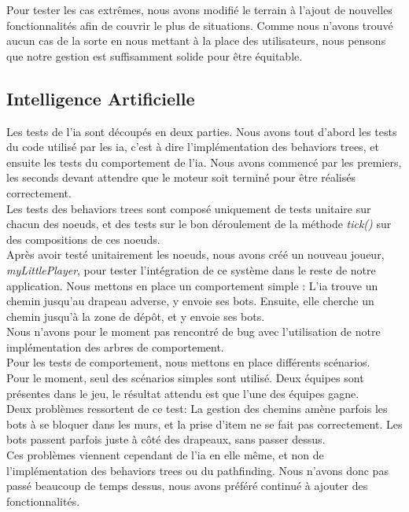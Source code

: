 Pour tester les cas extrêmes, nous avons modifié le terrain à l'ajout de nouvelles fonctionnalités afin de couvrir le plus de situations. Comme nous n'avons trouvé aucun cas de la sorte en nous mettant à la place des utilisateurs, nous pensons que notre gestion est suffisamment solide pour être équitable.

\newpage
\subsection{Intelligence Artificielle}
Les tests de l'ia sont découpés en deux parties. Nous avons tout d'abord les tests du code utilisé par les ia, c'est à dire l'implémentation des behaviors trees, et ensuite les tests du comportement de l'ia. Nous avons commencé par les premiers, les seconds devant attendre que le moteur soit terminé pour être réalisés correctement. \\

Les tests des behaviors trees sont composé uniquement de tests unitaire sur chacun des noeuds, et des tests sur le bon déroulement de la méthode \textit{tick()} sur des compositions de ces noeuds.\\
Après avoir testé unitairement les noeuds, nous avons créé un nouveau joueur, \textit{myLittlePlayer}, pour tester l'intégration de ce système dans le reste de notre application. Nous mettons en place un comportement simple : L'ia trouve un chemin jusqu'au drapeau adverse, y envoie ses bots. Ensuite, elle cherche un chemin jusqu'à la zone de dépôt, et y envoie ses bots.\\
Nous n'avons pour le moment pas rencontré de bug avec l'utilisation de notre implémentation des arbres de comportement.\\

Pour les tests de comportement, nous mettons en place différents scénarios.\\
Pour le moment, seul des scénarios simples sont utilisé. Deux équipes sont présentes dans le jeu,
le résultat attendu est que l'une des équipes gagne.\\

Deux problèmes ressortent de ce test: La gestion des chemins amène parfois les bots à se bloquer dans les murs, et la prise d'item ne se fait pas correctement. Les bots passent parfois juste à côté des drapeaux, sans passer dessus.\\
Ces problèmes viennent cependant de l'ia en elle même, et non de l'implémentation des behaviors trees ou du pathfinding. Nous n'avons donc pas passé beaucoup de temps dessus, nous avons préféré continué à ajouter des fonctionnalités.